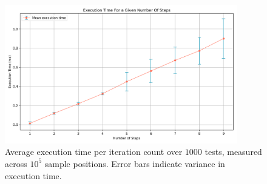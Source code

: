 \documentclass[final]{jcgt}
\begin{document}
\begin{figure}[h!] 
	\centering 
	\includegraphics[width=0.9\textwidth]{Figures/resultsExecutionTime.png} 
	\caption{Average execution time per iteration count over $1000$ tests, measured across $10^5$ sample positions. Error bars indicate variance in execution time.} 
	\label{fig:execution_time} 
\end{figure}

\afterdoc
\end{document}
